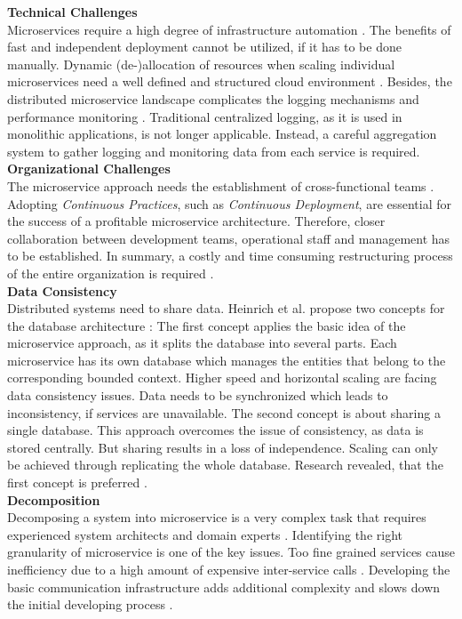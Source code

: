 \noindent
\textbf{Technical Challenges}\\
Microservices require a high degree of infrastructure automation \cite{MigratingTowardsSurvey}. The benefits of fast and independent deployment cannot be utilized, if it has to be done manually. Dynamic (de-)allocation of resources when scaling individual microservices need a well defined and structured cloud environment \cite{MigratingCloud}. 
Besides, the distributed microservice landscape complicates the logging mechanisms and performance monitoring \cite{SystematicMappingStudyMicroservice}. Traditional centralized logging, as it is used in monolithic applications, is not longer applicable. Instead, a careful aggregation system to gather logging and monitoring data from each service is required.\\

\noindent
\textbf{Organizational Challenges}\\
The microservice approach needs the establishment of cross-functional teams \cite{Fowler}. Adopting \textit{Continuous Practices}, such as \textit{Continuous Deployment}, are essential for the success of a profitable microservice architecture. Therefore, closer collaboration between development teams, operational staff and management has to be established. In summary, a costly and time consuming restructuring process of the entire organization is required \cite{NikoProseminar}. \\


\noindent
\textbf{Data Consistency}\\
Distributed systems need to share data. Heinrich et al. propose two concepts for the database architecture \cite{FunctionalDecompositionHeinrich}: The first concept applies the basic idea of the microservice approach, as it splits the database into several parts. Each microservice has its own database which manages the entities that belong to the corresponding bounded context. Higher speed and horizontal scaling are facing data consistency issues. Data needs to be synchronized which leads to inconsistency, if services are unavailable. The second concept is about sharing a single database. This approach overcomes the issue of consistency, as data is stored centrally. But sharing results in a loss of independence. Scaling can only be achieved through replicating the whole database. Research revealed, that the first concept is preferred \cite{FunctionalDecompositionHeinrich}. \\



\noindent
\textbf{Decomposition}\\
Decomposing a system into microservice is a very complex task that requires experienced system architects and domain experts \cite{Fowler}. Identifying the right granularity of microservice is one of the key issues. Too fine grained services cause inefficiency due to a high amount of expensive inter-service calls \cite{DomainEngineeringMunezero}. Developing the basic communication infrastructure adds additional complexity and slows down the initial developing process \cite{infoq}. 





